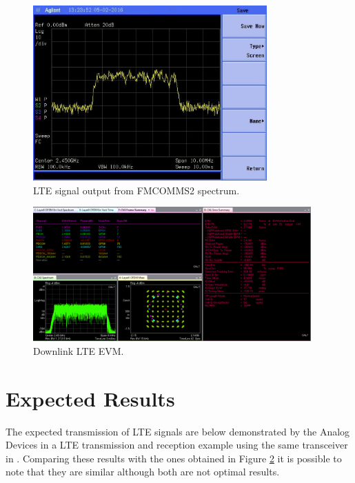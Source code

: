 \begin{figure}[htbp]
    \centering
    \includegraphics[width=0.8\textwidth,
    trim={0 0 {.27\textwidth} {.1\textwidth}},
    clip]{./figures/lte_5m}
    \caption{ LTE signal output from FMCOMMS2 spectrum.
    \label{fig:lte5m}}
\end{figure}

%
\begin{figure}[htbp]
    \centering
    \includegraphics[width=0.95\textwidth]{./figures/evm}
    \caption{ Downlink LTE EVM.
    \label{fig:evm}}
\end{figure}
%
\vfill
\clearpage

\section{Expected Results}
\label{result:optimum}

The expected transmission of LTE signals are below demonstrated by the Analog
Devices in a LTE transmission and reception example using the same
transceiver in \cite{web:lteexamplewiki}. Comparing these results with the ones
obtained in Figure \ref{fig:evm} it is possible to note that they are similar
although both are not optimal results.

